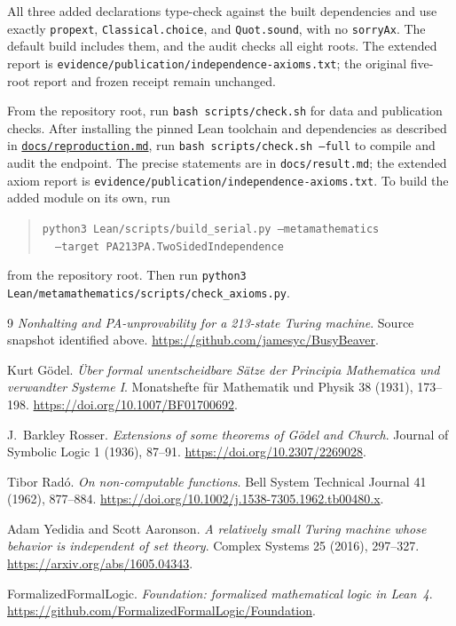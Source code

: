 \documentclass[11pt,letterpaper]{article}
\newcommand{\src}[2]{\href{https://github.com/jamesyc/BusyBeaver/blob/034d08df73b94e9f4036fc5af74b694eb73afc67/#1}{\texttt{\nolinkurl{#2}}}}
\newcommand{\repo}[1]{\texttt{\nolinkurl{#1}}}
\begin{document}
All three added declarations type-check against the built
dependencies and use exactly \texttt{propext}, \texttt{Classical.choice},
and \texttt{Quot.sound}, with no \texttt{sorryAx}. The default build
includes them, and the audit checks all eight roots. The extended report
is \repo{evidence/publication/independence-axioms.txt}; the original
five-root report and frozen receipt remain unchanged.

From the repository root, run \texttt{bash scripts/check.sh} for data and
publication checks. After installing the pinned Lean toolchain and
dependencies as described in
\src{docs/reproduction.md}{docs/reproduction.md}, run
\texttt{bash scripts/check.sh --full} to compile and audit the endpoint.
The precise statements are in \repo{docs/result.md}; the extended axiom
report is \repo{evidence/publication/independence-axioms.txt}.
To build the added module on its own, run
\begin{quote}\small
\texttt{python3 Lean/scripts/build\_serial.py --metamathematics} \\
\texttt{\ \ --target PA213PA.TwoSidedIndependence}
\end{quote}
from the repository root. Then run
\texttt{python3 Lean/metamathematics/scripts/check\_axioms.py}.

\begin{thebibliography}{9}
\small
{}
\emph{Nonhalting and PA-unprovability for a 213-state Turing
machine}. Source snapshot identified above.
\url{https://github.com/jamesyc/BusyBeaver}.

Kurt G\"odel. \emph{\"Uber formal unentscheidbare S\"atze der Principia
Mathematica und verwandter Systeme I}. Monatshefte f\"ur Mathematik und
Physik 38 (1931), 173--198.
\url{https://doi.org/10.1007/BF01700692}.

J.~Barkley Rosser. \emph{Extensions of some theorems of G\"odel and Church}.
Journal of Symbolic Logic 1 (1936), 87--91.
\url{https://doi.org/10.2307/2269028}.

Tibor Rad\'o. \emph{On non-computable functions}. Bell System Technical
Journal 41 (1962), 877--884.
\url{https://doi.org/10.1002/j.1538-7305.1962.tb00480.x}.

Adam Yedidia and Scott Aaronson. \emph{A relatively small Turing machine
whose behavior is independent of set theory}. Complex Systems 25 (2016),
297--327. \url{https://arxiv.org/abs/1605.04343}.

FormalizedFormalLogic. \emph{Foundation: formalized mathematical logic in
Lean~4}. \url{https://github.com/FormalizedFormalLogic/Foundation}.

\end{thebibliography}
\end{document}
